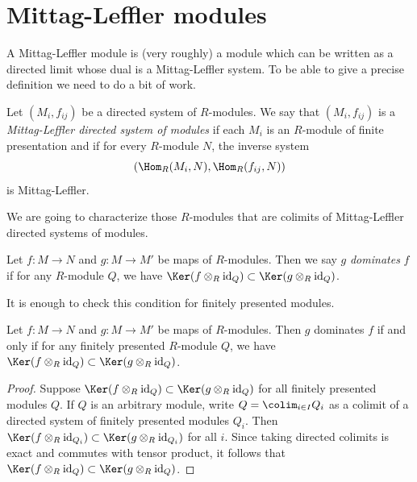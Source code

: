 \section{Mittag-Leffler modules}
\label{section-mittag-leffler-modules}

\noindent
A Mittag-Leffler module is (very roughly) a module which can be written
as a directed limit whose dual is a Mittag-Leffler system. To be able
to give a precise definition we need to do a bit of work.

\begin{definition}
\label{definition-ML-inductive-system}
Let $(M_i, f_{ij})$ be a directed system of $R$-modules.  We say that
$(M_i, f_{ij})$ is a {\it Mittag-Leffler directed system of modules} if each
$M_i$ is an $R$-module of finite presentation and if for every $R$-module $N$,
the inverse system
$$
(\Hom_R(M_i, N), \Hom_R(f_{ij}, N))
$$
is Mittag-Leffler.
\end{definition}

\noindent
We are going to characterize those $R$-modules that are colimits of
Mittag-Leffler directed systems of modules.

\begin{definition}
\label{definition-domination}
Let $f: M \to N$ and $g: M \to M'$ be maps of $R$-modules.
Then we say $g$ {\it dominates} $f$ if for any $R$-module $Q$, we have $\Ker(f
\otimes_R \text{id}_Q) \subset \Ker(g \otimes_R \text{id}_Q)$.
\end{definition}

\noindent
It is enough to check this condition for finitely presented modules.

\begin{lemma}
\label{lemma-domination-fp}
Let $f: M \to N$ and $g: M \to M'$ be maps of $R$-modules.
Then $g$ dominates $f$ if and only if for any finitely presented $R$-module
$Q$, we have $\Ker(f \otimes_R \text{id}_Q) \subset \Ker(g \otimes_R
\text{id}_Q)$.
\end{lemma}

\begin{proof}
Suppose $\Ker(f \otimes_R \text{id}_Q) \subset \Ker(g \otimes_R
\text{id}_Q)$ for all finitely presented modules $Q$.  If $Q$ is an
arbitrary module, write $Q = \colim_{i \in I} Q_i$ as a colimit of a
directed
system of finitely presented modules $Q_i$.  Then $\Ker(f \otimes_R
\text{id}_{Q_i}) \subset \Ker(g \otimes_R \text{id}_{Q_i})$ for
all $i$.  Since taking directed colimits is exact and commutes with tensor
product, it follows that $\Ker(f \otimes_R \text{id}_Q) \subset \Ker(g
\otimes_R \text{id}_Q)$.
\end{proof}

